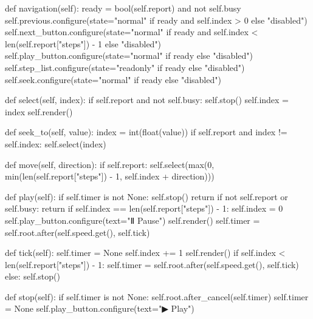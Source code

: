 \begin{lightcode}[numbers=left,firstnumber=1]
    def navigation(self):
        ready = bool(self.report) and not self.busy
        self.previous.configure(state="normal" if ready and self.index > 0 else "disabled")
        self.next_button.configure(state="normal" if ready and self.index < len(self.report["steps"]) - 1 else "disabled")
        self.play_button.configure(state="normal" if ready else "disabled")
        self.step_list.configure(state="readonly" if ready else "disabled")
        self.seek.configure(state="normal" if ready else "disabled")

    def select(self, index):
        if self.report and not self.busy:
            self.stop()
            self.index = index
            self.render()

    def seek_to(self, value):
        index = int(float(value))
        if self.report and index != self.index:
            self.select(index)

    def move(self, direction):
        if self.report:
            self.select(max(0, min(len(self.report["steps"]) - 1, self.index + direction)))

    def play(self):
        if self.timer is not None:
            self.stop()
            return
        if not self.report or self.busy:
            return
        if self.index == len(self.report["steps"]) - 1:
            self.index = 0
        self.play_button.configure(text="Ⅱ Pause")
        self.render()
        self.timer = self.root.after(self.speed.get(), self.tick)

    def tick(self):
        self.timer = None
        self.index += 1
        self.render()
        if self.index < len(self.report["steps"]) - 1:
            self.timer = self.root.after(self.speed.get(), self.tick)
        else:
            self.stop()

    def stop(self):
        if self.timer is not None:
            self.root.after_cancel(self.timer)
            self.timer = None
        self.play_button.configure(text="▶ Play")


\end{lightcode}

